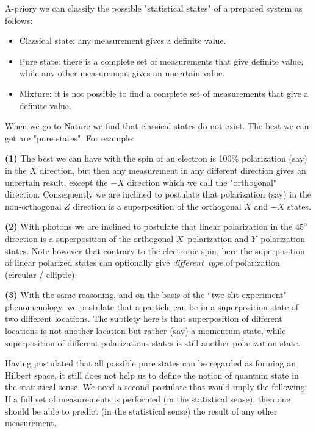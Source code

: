 \documentclass[onecolumn,fleqn, 11pt]{revtex4}
\begin{document}
A-priory we can classify the possible "statistical states" 
of a prepared system as follows: 
\begin{itemize}
\item Classical state: any measurement gives a definite value.
\item Pure state: there is a complete set of measurements that 
give definite value, while any other measurement gives an uncertain value.
\item Mixture: it is not possible to find a complete set of 
measurements that give a definite value. 
\end{itemize}
When we go to Nature we find that classical states do not exist. 
The best we can get are "pure states". For example:

{\bf (1)} The best we can have with the spin of an electron 
is 100\% polarization (say) in the $X$ direction, 
but then any measurement in any different direction 
gives an uncertain result, except the $-X$ direction which we 
call the "orthogonal" direction. Consequently we are inclined 
to postulate that polarization (say) in the non-orthogonal $Z$ direction 
is a superposition of the orthogonal $X$ and $-X$ states.

{\bf (2)} With photons we are inclined to postulate that 
linear polarization in the $45^o$ direction is a superposition 
of the orthogonal $X$~polarization and $Y$~polarization states.
Note however that contrary to the electronic spin, 
here the superposition of linear polarized states can optionally 
give {\em different~type} of polarization (circular / elliptic).   
  
{\bf (3)} With the same reasoning, and on the basis of the ``two slit experiment" 
phenomenology, we postulate that a particle can be in a superposition 
state of two different locations.  The subtlety here is that superposition 
of different locations is not another location but rather (say) a momentum state, 
while superposition of different polarizations states is still another 
polarization state. 

Having postulated that all possible pure states can be regarded  
as forming an Hilbert space, it still does not help us to define 
the notion of quantum state in the statistical sense.
We need a second postulate that would imply the following: 
If a full set of measurements is performed (in the statistical sense), 
then one should be able to predict (in the statistical sense) the result 
of any other measurement. 
\end{document}
